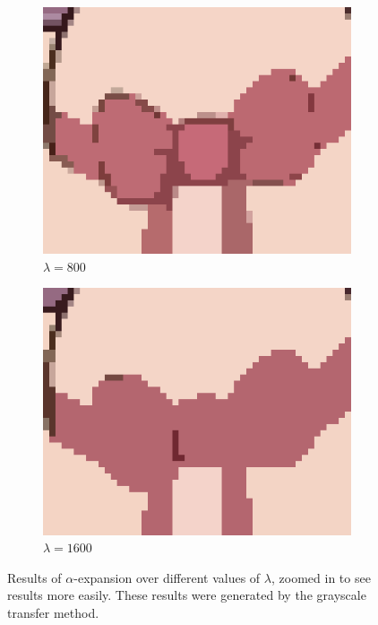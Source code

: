 \documentclass[10pt,twocolumn,letterpaper]{article}
\begin{document}
\begin{figure}
\begin{subfigure}{.48\linewidth}
\includegraphics[width=\linewidth]{alphaResults/bow_large_0800.png}
\caption{$\lambda = 800$}
\end{subfigure}
\begin{subfigure}{.48\linewidth}
\includegraphics[width=\linewidth]{alphaResults/bow_large_1600.png}
\caption{$\lambda = 1600$}
\end{subfigure}
\caption{Results of $\alpha$-expansion over different values of $\lambda$, zoomed in to see results more easily. These results were generated by the grayscale transfer method.}
\label{fig:alphaResultsBow}
\end{figure}
\end{document}

